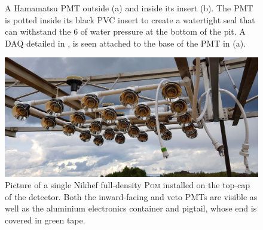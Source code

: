 \begin{figure} %
    \centering
    \quad
    \caption[Pictures of the Madison PMT assembly]
    {A Hamamatsu PMT outside (a) and inside its insert (b). The PMT is potted inside its black PVC
        insert to create a watertight seal that can withstand the \SI{6}{} of water
        pressure at the bottom of the pit. A \si{\micro}DAQ detailed in , is
        seen attached to the base of the PMT in (a).}
    \label{fig:madison_pmt_assembly}
\end{figure}

\begin{figure} %
    \includegraphics[width=\textwidth]{diagrams/4-chips/single_plane.pdf}
    \caption[Picture of a Nikhef \textsc{Pom}]
    {Picture of a single Nikhef full-density \textsc{Pom} installed on the top-cap of the
        \chipsfive detector. Both the inward-facing and veto PMTs are visible as well as the
        aluminium electronics container and pigtail, whose end is covered in green tape.}
    \label{fig:single_plane}
\end{figure}

